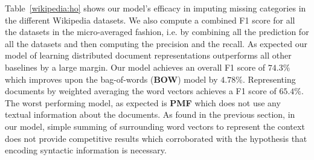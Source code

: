 Table~\ref{wikipedia:ho} shows our model's efficacy in imputing missing categories in the different Wikipedia datasets. We also compute a combined F1 score for all the datasets in the micro-averaged fashion, i.e. by combining all the prediction for all the datasets and then computing the precision and the recall. 
As expected our model of learning distributed document representations outperforms all other baselines by a large margin. 
Our model achieves an overall F1 score of $74.3\%$ which improves upon the bag-of-words (\textbf{BOW}) model by $4.78\%$. 
Representing documents by weighted averaging the word vectors achieves a F1 score of $65.4\%$. 
The worst performing model, as expected is \textbf{PMF} which does not use any textual information about the documents.
As found in the previous section, in our model, simple summing of surrounding word vectors to represent the context does not provide competitive results which corroborated with the hypothesis that encoding syntactic information is necessary. 

